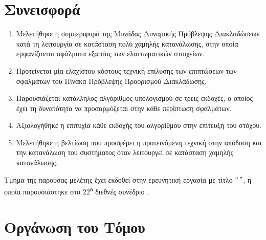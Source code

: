 \section{Συνεισφορά}
\label{chap1_Contribution}

\begin{enumerate}[itemsep=0.5pt]
    \item Μελετήθηκε η συμπεριφορά της Μονάδας Δυναμικής Πρόβλεψης Διακλαδώσεων κατά τη λειτουργία σε κατάσταση πολύ χαμηλής κατανάλωσης, στην οποία εμφανίζονται σφάλματα εξαιτίας των ελαττωματικών στοιχείων.
    \item Προτείνεται μία ελαχίστου κόστους τεχνική επίλυσης των επιπτώσεων των σφαλμάτων του Πίνακα Πρόβλεψης Προορισμού Διακλάδωσης.
    \item Παρουσιάζεται κατάλληλος αλγόριθμος υπολογισμού σε τρεις εκδοχές, ο οποίος έχει τη δυνατότητα να προσαρμόζεται στην κάθε περίπτωση σφαλμάτων.
    \item Αξιολογήθηκε η επιτυχία κάθε εκδοχής του αλγορίθμου στην επίτευξη του στόχου.
    \item Μελετήθηκε η βελτίωση που προσφέρει η προτεινόμενη τεχνική στην απόδοση και την κατανάλωση του συστήματος όταν λειτουργεί σε κατάσταση χαμηλής κατανάλωσης.
\end{enumerate}

Τμήμα της παρούσας μελέτης έχει εκδοθεί στην ερευνητική εργασία με τίτλο $``$\textit{}$"$, η οποία παρουσιάστηκε στο 22\textsuperscript{ο} διεθνές συνέδριο  \cite{filippou2016recovery}.


\section{Οργάνωση του Τόμου}
\label{chap1_Organization}

